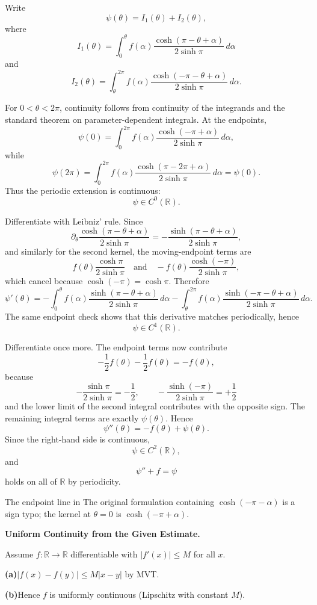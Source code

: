\begin{solution}
Write
\[
\psi(\theta)=I_1(\theta)+I_2(\theta),
\]
where
\[
I_1(\theta)
=
\int_0^\theta
f(\alpha)
\frac{\cosh(\pi-\theta+\alpha)}{2\sinh\pi}\,d\alpha
\]
and
\[
I_2(\theta)
=
\int_\theta^{2\pi}
f(\alpha)
\frac{\cosh(-\pi-\theta+\alpha)}{2\sinh\pi}\,d\alpha.
\]

For \(0<\theta<2\pi\), continuity follows from continuity of the integrands and the
standard theorem on parameter-dependent integrals. At the endpoints,
\[
\psi(0)
=
\int_0^{2\pi}
f(\alpha)
\frac{\cosh(-\pi+\alpha)}{2\sinh\pi}\,d\alpha,
\]
while
\[
\psi(2\pi)
=
\int_0^{2\pi}
f(\alpha)
\frac{\cosh(\pi-2\pi+\alpha)}{2\sinh\pi}\,d\alpha
=
\psi(0).
\]
Thus the periodic extension is continuous:
\[
\boxed{\psi\in C^0(\mathbb R).}
\]

Differentiate with Leibniz' rule. Since
\[
\partial_\theta
\frac{\cosh(\pi-\theta+\alpha)}{2\sinh\pi}
=
-
\frac{\sinh(\pi-\theta+\alpha)}{2\sinh\pi},
\]
and similarly for the second kernel, the moving-endpoint terms are
\[
f(\theta)\frac{\cosh\pi}{2\sinh\pi}
\quad\text{and}\quad
-f(\theta)\frac{\cosh(-\pi)}{2\sinh\pi},
\]
which cancel because \(\cosh(-\pi)=\cosh\pi\). Therefore
\[
\boxed{
\psi'(\theta)
=
-
\int_0^\theta
f(\alpha)
\frac{\sinh(\pi-\theta+\alpha)}{2\sinh\pi}\,d\alpha
-
\int_\theta^{2\pi}
f(\alpha)
\frac{\sinh(-\pi-\theta+\alpha)}{2\sinh\pi}\,d\alpha.
}
\]
The same endpoint check shows that this derivative matches periodically, hence
\[
\psi\in C^1(\mathbb R).
\]

Differentiate once more. The endpoint terms now contribute
\[
-\frac12f(\theta)-\frac12f(\theta)=-f(\theta),
\]
because
\[
-\frac{\sinh\pi}{2\sinh\pi}=-\frac12,
\qquad
-\frac{\sinh(-\pi)}{2\sinh\pi}=+\frac12
\]
and the lower limit of the second integral contributes with the opposite sign. The
remaining integral terms are exactly \(\psi(\theta)\). Hence
\[
\boxed{
\psi''(\theta)=-f(\theta)+\psi(\theta).
}
\]
Since the right-hand side is continuous,
\[
\psi\in C^2(\mathbb R),
\]
and
\[
\boxed{
\psi''+f=\psi
}
\]
holds on all of \(\mathbb R\) by periodicity.

The endpoint line in The original formulation containing \(\cosh(-\pi-\alpha)\) is a sign typo;
the kernel at \(\theta=0\) is \(\cosh(-\pi+\alpha)\).
\end{solution}


\begin{problem}[CP-II-0499]
\label{prob:cp-ii-0499}
\textbf{Uniform Continuity from the Given Estimate.}

\hspace*{1.5em}Assume $f:\mathbb{R}\to\mathbb{R}$ differentiable with $|f'(x)|\le M$ for all $x$.

\renewcommand\labelenumi{(\alph{enumi})}
\par\smallskip\noindent\textbf{(a)}\quad $|f(x)-f(y)|\le M|x-y|$ by MVT.
\par\smallskip\noindent\textbf{(b)}\quad Hence $f$ is uniformly continuous (Lipschitz with constant $M$).
\end{problem}

